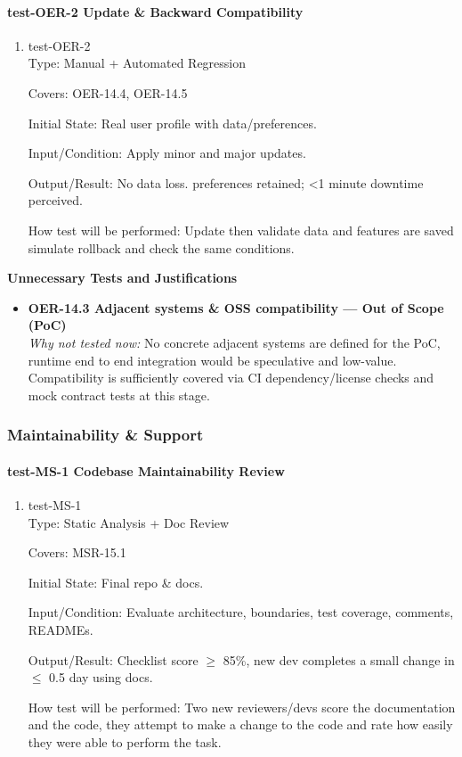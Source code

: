 \documentclass[12pt, titlepage]{article}
\begin{document}
\paragraph{test-OER-2 Update \& Backward Compatibility}

\begin{enumerate}
\item{test-OER-2\\}
Type: Manual + Automated Regression

Covers: OER-14.4, OER-14.5

Initial State: Real user profile with data/preferences.

Input/Condition: Apply minor and major updates.

Output/Result: No data loss. preferences retained; <1 minute downtime perceived.

How test will be performed: Update then validate data and features are saved simulate rollback and check the same conditions.
\end{enumerate}

\noindent\textbf{Unnecessary Tests and Justifications}
\begin{itemize}
\item \textbf{OER-14.3 Adjacent systems \& OSS compatibility — Out of Scope (PoC)}\\
\emph{Why not tested now:} No concrete adjacent systems are defined for the PoC, runtime end to end integration would be speculative and low-value. Compatibility is sufficiently covered via CI dependency/license checks and mock contract tests at this stage.
\end{itemize}

\subsubsection{Maintainability \& Support}

\paragraph{test-MS-1 Codebase Maintainability Review}

\begin{enumerate}
\item{test-MS-1\\}
Type: Static Analysis + Doc Review

Covers: MSR-15.1

Initial State: Final repo \& docs.

Input/Condition: Evaluate architecture, boundaries, test coverage, comments, READMEs.

Output/Result: Checklist score $\geq$ 85\%, new dev completes a small change in $\leq$ 0.5 day using docs.

How test will be performed: Two new reviewers/devs score the documentation and the code, they attempt to make a change to the code and rate how easily they were able to perform the task.
\end{enumerate}
\end{document}
